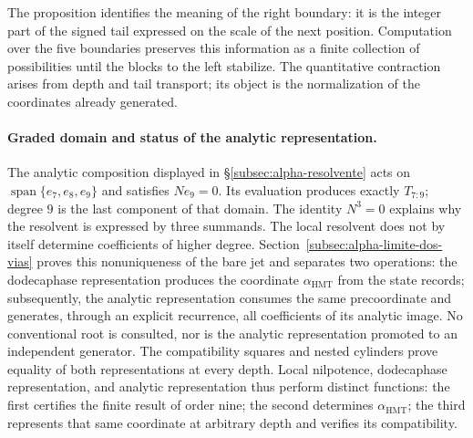 The proposition identifies the meaning of the right boundary: it is the
integer part of the signed tail expressed on the scale of the next
position. Computation over the five boundaries preserves this information
as a finite collection of possibilities until the blocks to the left
stabilize. The quantitative contraction arises from depth and tail
transport; its object is the normalization of the coordinates already generated.

\paragraph{Graded domain and status of the analytic representation.}
\label{ampl-alfa-dominio-resolvente}
The analytic composition displayed in
\S\ref{subsec:alpha-resolvente} acts on
$\operatorname{span}\{e_7,e_8,e_9\}$ and satisfies $Ne_9=0$. Its
evaluation produces exactly $T_{7:9}$; degree $9$ is the last
component of that domain. The identity $N^3=0$ explains why the
resolvent is expressed by three summands. The local resolvent does not by
itself determine coefficients of higher degree.
Section~\ref{subsec:alpha-limite-dos-vias} proves this nonuniqueness of the
bare jet and separates two operations: the dodecaphase representation produces the
coordinate \(\alpha_{\mathrm{HMT}}\) from the state records; subsequently,
the analytic representation consumes the same precoordinate and generates, through an
explicit recurrence, all coefficients of its analytic image. No
conventional root is consulted, nor is the analytic representation promoted to an
independent generator. The compatibility squares and nested cylinders
prove equality of both representations at every depth. Local
nilpotence, dodecaphase representation, and analytic representation
thus perform distinct functions: the first certifies the finite result
of order nine; the second determines \(\alpha_{\mathrm{HMT}}\); the third
represents that same coordinate at arbitrary depth and verifies its compatibility.
